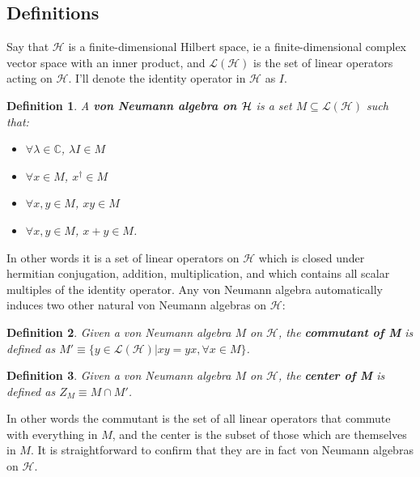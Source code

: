\documentclass[12pt]{article}
\newcommand{\bi}{\begin{itemize}}
\newcommand{\ei}{\end{itemize}}
\newcommand{\Ll}{\mathcal{L}}
\newcommand{\Hh}{\mathcal{H}}
\newcommand{\LH}{\Ll(\Hh)}
\newtheorem{mydef}{Definition}[section]
\begin{document}
\subsection{Definitions}
Say that $\Hh$ is a finite-dimensional Hilbert space, ie a finite-dimensional complex vector space with an inner product, and $\LH$ is the set of linear operators acting on $\Hh$.  I'll denote the identity operator in $\Hh$ as $I$.
\begin{mydef}\label{vndef}
A \textbf{von Neumann algebra on $\bf{\Hh}$} is a set $M\subseteq \Ll(\Hh)$ such that:
\bi
\item $\forall \lambda \in \mathbb{C}$, $\lambda I\in M$ 
\item $\forall x \in M$, $x^\dagger \in M$ 
\item $\forall x,y\in M$, $xy\in M$ 
\item $\forall x,y \in M$, $x+y\in M$.
\ei
\end{mydef}
In other words it is a set of linear operators on $\Hh$ which is closed under hermitian conjugation, addition, multiplication, and which contains all scalar multiples of the identity operator.  Any von Neumann algebra automatically induces two other natural von Neumann algebras on $\mathcal{H}$:
\begin{mydef}
Given a von Neumann algebra $M$ on $\mathcal{H}$, the \textbf{commutant of M} is defined as $M'\equiv \{y\in \LH | xy=yx, \forall x\in M\}$.
\end{mydef}
\begin{mydef}
Given a von Neumann algebra $M$ on $\mathcal{H}$, the \textbf{center of M} is defined as $Z_M\equiv M\cap M'$.
\end{mydef}
In other words the commutant is the set of all linear operators that commute with everything in $M$, and the center is the subset of those which are themselves in $M$.  It is straightforward to confirm that they are in fact von Neumann algebras on $\Hh$.
\end{document}
